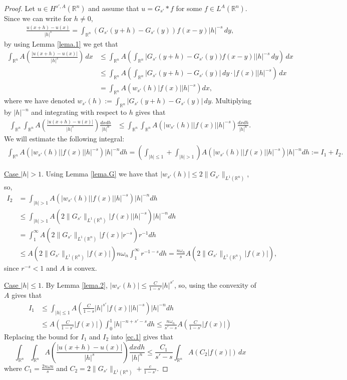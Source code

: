 \documentclass[10pt,a4paper]{amsart}
\newcommand{\R}{\mathbb R}
\begin{document}
\begin{proof}
Let $u\in H^{s',A}(\R^n)$ and assume that $u=G_{s'}* f$ for some  $f\in L^A(\R^n)$. Since we can write for $h\neq 0$,
\begin{align*}
\frac{u(x+h)-u(x)}{|h|^s} = \int_{\R^n} (G_{s'}(y+h)-G_{s'}(y))f(x-y)|h|^{-s}\,dy,
\end{align*}
by using Lemma \ref{lema.1} we get that
\begin{align*}
\int_{\R^n} A\left(\frac{|u(x+h)-u(x)|}{|h|^s}\right)\,dx &\leq \int_{\R^n} A\left(\int_{\R^n} |G_{s'}(y+h)-G_{s'}(y))f(x-y)||h|^{-s}\,dy \right)\,dx\\
&\leq \int_{\R^n} A\left( \int_{\R^n}|G_{s'}(y+h)-G_{s'}(y)|\,dy \cdot |f(x)| |h|^{-s}\right)\,dx\\
&= \int_{\R^n} A\left( w_{s'}(h) |f(x)| |h|^{-s}\right)dx,
\end{align*}
where we have denoted $w_{s'}(h):=\int_{\R^n}|G_{s'}(y+h)-G_{s'}(y)|\,dy $. Multiplying by $|h|^{-n}$ and integrating with respect to $h$ gives that
\begin{align} \label{ec.1}
\int_{\R^n}\int_{\R^n} A\left(\frac{|u(x+h)-u(x)|}{|h|^s}\right)\frac{dxdh}{|h|^n}
&\leq \int_{\R^n} \int_{\R^n} A\left( |w_{s'}(h)| |f(x)| |h|^{-s}\right)\frac{dxdh}{|h|^n}.
\end{align}
We will estimate the following integral:
\begin{align*}
\int_{\R^n} A\left( |w_{s'}(h)| |f(x)| |h|^{-s}\right)|h|^{-n}dh = \left(\int_{|h|\leq 1} + \int_{|h|>1} \right) A\left( |w_{s'}(h)| |f(x)| |h|^{-s}\right)|h|^{-n}dh:=I_1+ I_2.
\end{align*}

\underline{Case $|h|> 1$}. Using Lemma \ref{lema.G} we have that $|w_{s'}(h)|\leq 2\|G_{s'}\|_{L^1(\R^n)}$, so,
\begin{align*}
I_2&= \int_{|h|>1} A\left( |w_{s'}(h)| |f(x)| |h|^{-s}\right)|h|^{-n}dh\\
&\leq 
\int_{|h|>1} A\left( 2\|G_{s'}\|_{L^1(\R^n)}|f(x)| |h|^{-s}\right)|h|^{-n}dh \\
&=
\int_1^\infty  A\left( 2\|G_{s'}\|_{L^1(\R^n)} |f(x)| r^{-s}\right)r^{-1}dh\\
&\leq 
A\left(2\|G_{s'}\|_{L^1(\R^n)} |f(x)| \right) n\omega_n\int_1^\infty  r^{-1-s}dh=  \frac{n\omega_n}{s} A\left(2\|G_{s'}\|_{L^1(\R^n)} |f(x)| \right),
\end{align*}
since $r^{-s}<1$ and $A$ is convex. 

\underline{Case $|h|\leq 1$}. By Lemma \ref{lema.2}, $|w_{s'}(h)|\leq \frac{C}{1-s'}|h|^{s'}$, so, using the convexity of $A$ gives that
\begin{align*}
I_1&\leq \int_{|h|\leq 1} A\left( \tfrac{C}{1-s}|h|^{s'} |f(x)| |h|^{-s}\right)|h|^{-n}dh\\
&\leq A(\tfrac{C}{1-s'}|f(x)|) \int_{0}^1 |h|^{-n+s'-s}dh\leq \frac{n\omega_n}{s'-s}A(\tfrac{C}{1-s'}|f(x)|) 
\end{align*}
Replacing the bound for $I_1$ and $I_2$ into \eqref{ec.1} gives that
$$
\int_{\R^n}\int_{\R^n} A\left(\frac{|u(x+h)-u(x)|}{|h|^s}\right)\frac{dxdh}{|h|^n}
\leq  \frac{C_1}{s'-s} \int_{\R^n} A(C_2 |f(x)|)\,dx
$$
where $C_1=\frac{2n\omega n}{s}$ and $C_2=2\|G_{s'}\|_{L^1(\R^n)} + \frac{c}{1-s'}$.


\end{proof}
\end{document}
